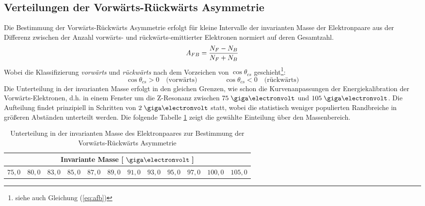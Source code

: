 \subsection{Verteilungen der Vorwärts-Rückwärts Asymmetrie}
\label{afb:distributions}
Die Bestimmung der Vorwärts-Rückwärts Asymmetrie erfolgt für kleine Intervalle
der invarianten Masse der Elektronpaare aus der Differenz zwischen der Anzahl
vorwärts- und rückwärts-emittierter Elektronen normiert auf deren Gesamtzahl.
\begin{equation}
    A_{FB} = \frac{N_F - N_B}{N_F + N_B}
    \label{eq:afb_simple}
\end{equation}
Wobei die Klassifizierung \textit{vorwärts} und \textit{rückwärts} nach dem
Vorzeichen von $\cos\theta_{cs}$ geschieht\footnote{siehe auch Gleichung
(\ref{eq:afb})}:
\begin{equation}
    \cos\theta_{cs} > 0 \quad\text{(vorwärts)}
    \qquad \qquad
    \cos\theta_{cs} < 0 \quad\text{(rückwärts)}
\end{equation}
Die Unterteilung in der invarianten Masse erfolgt in den gleichen Grenzen, wie
schon die Kurvenanpassungen der Energiekalibration der Vorwärts-Elektronen,
d.h. in einem Fenster um die Z-Resonanz zwischen $75\GeV$ und $105\GeV$. Die
Aufteilung findet prinzipiell in Schritten von $2\GeV$ statt, wobei die
statistisch weniger populierten Randbreiche in größeren Abständen unterteilt
werden. Die folgende Tabelle \ref{tab:binning_afb} zeigt die gewählte
Einteilung über den Massenbereich.
\begin{table}[h]
    \centering
    \begin{tabular}{|c|c|c|c|c|c|c|c|c|c|c|c|}
        \multicolumn{12}{c}{\textbf{Invariante Masse} [$\GeV\:$]} \\
        \hline
        $75,0$ & $80,0$ & $83,0$ & $85,0$ & $87,0$ & $89,0$ & $91,0$ & $93,0$ &
        $95,0$ & $97,0$ & $100,0$ & $105,0$
        \\ \hline
    \end{tabular}
    \caption[Unterteilung in der invarianten Masse des Elektronpaares zur
        Bestimmung der Vorwärts-Rückwärts Asymmetrie]
        {Unterteilung in der invarianten Masse des Elektronpaares zur
        Bestimmung der Vorwärts-Rückwärts Asymmetrie}
    \label{tab:binning_afb}
\end{table}

